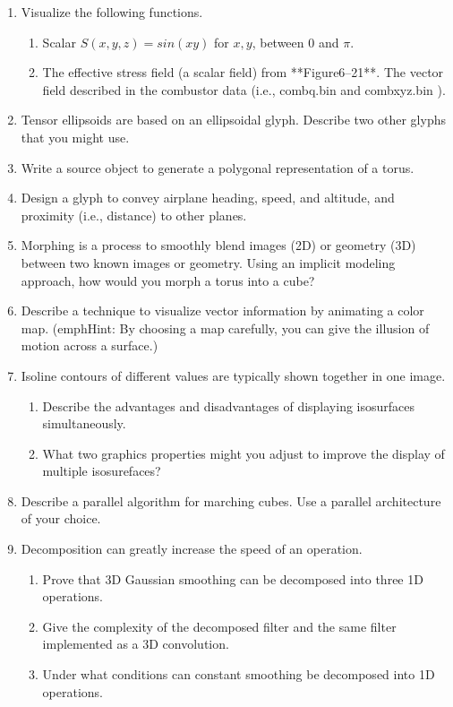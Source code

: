 \begin{enumerate}
\item Visualize the following functions.
\begin{enumerate}
	\item Scalar $S(x,y,z)=sin(xy)$ for $x,y$, between $0$ and $\pi$.
	\item The effective stress field (a scalar field) from **Figure6–21**.
	\iterm The vector field described in the combustor data (i.e., combq.bin and combxyz.bin ).
\end{enumerate}

\item Tensor ellipsoids are based on an ellipsoidal glyph. Describe two other glyphs that you might use.

\item Write a source object to generate a polygonal representation of a torus.

\item Design a glyph to convey airplane heading, speed, and altitude, and proximity (i.e., distance) to other planes.

\item Morphing is a process to smoothly blend images (2D) or geometry (3D) between two known images or geometry. Using an implicit modeling approach, how would you morph a torus into a cube?

\item Describe a technique to visualize vector information by animating a color map. (emph{Hint:} By choosing a map carefully, you can give the illusion of motion across a surface.)

\item Isoline contours of different values are typically shown together in one image.
\begin{enumerate}
	\item Describe the advantages and disadvantages of displaying isosurfaces simultaneously.
	\item What two graphics properties might you adjust to improve the display of multiple isosurefaces?
\end{enumerate}

\item Describe a parallel algorithm for marching cubes. Use a parallel architecture of your choice.

\item Decomposition can greatly increase the speed of an operation.
\begin{enumerate}
	\item  Prove that 3D Gaussian smoothing can be decomposed into three 1D operations.
	\item Give the complexity of the decomposed filter and the same filter implemented as a 3D convolution.
	\item Under what conditions can constant smoothing be decomposed into 1D operations.
\end{enumerate}

\end{enumerate}
